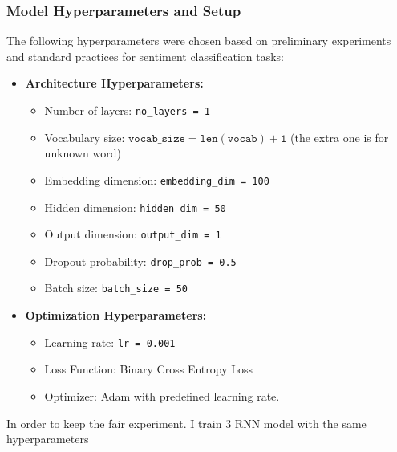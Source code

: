 \documentclass[12pt,a4paper]{article}
\begin{document}
\subsubsection{Model Hyperparameters and Setup}
The following hyperparameters were chosen based on preliminary experiments and standard practices for sentiment classification tasks:
\begin{itemize}
    \item \textbf{Architecture Hyperparameters:}
    \begin{itemize}
        \item Number of layers: \texttt{no\_layers = 1}
        \item Vocabulary size: \(\mathtt{vocab\_size = len(vocab) + 1}\) (the extra one is for unknown word)
        \item Embedding dimension: \texttt{embedding\_dim = 100}
        \item Hidden dimension: \texttt{hidden\_dim = 50}
        \item Output dimension: \texttt{output\_dim = 1}
        \item Dropout probability: \texttt{drop\_prob = 0.5}
        \item Batch size: \texttt{batch\_size = 50}
    \end{itemize}
    \item \textbf{Optimization Hyperparameters:}
    \begin{itemize}
        \item Learning rate: \texttt{lr = 0.001}
        \item Loss Function: Binary Cross Entropy Loss
        \item Optimizer: Adam with predefined learning rate.
    \end{itemize}
\end{itemize}
In order to keep the fair experiment. I train 3 RNN model with the same hyperparameters
\end{document}
